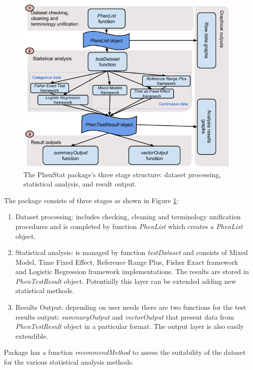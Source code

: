 \documentclass[12pt,a4paper]{article}
\begin{document}
\begin{figure}[!htpb]%
\centerline{\includegraphics[scale=0.5]{PhenStat_simple.png}}
\caption{The PhenStat package's three stage structure: dataset processing, statistical analysis, and result output.}\label{fig:01}
\end{figure}

The package consists of three stages as shown in Figure \ref{fig:01}:
\begin{enumerate}
\item Dataset processing: includes checking, cleaning and terminology unification procedures and is completed by function \textit{PhenList} which creates a \textit{PhenList} object. 
\item Statistical analysis: is managed by function \textit{testDataset} and consists of Mixed Model, Time Fixed Effect, Reference Range Plus, Fisher Exact framework and Logistic Regression framework implementations. The results are stored in \textit{PhenTestResult} object. 
Potentially this layer can be extended adding new statistical methods. 
\item Results Output: depending on user needs there are two functions for the test results output: \textit{summaryOutput} 
and \textit{vectorOutput} that present data from \textit{PhenTestResult} object in a particular format. The output layer is also easily extendible.
\end{enumerate}

Package has a function \textit{recommendMethod} to assess the suitability of the dataset for the various statistical analysis methods.
 
\end{document}
